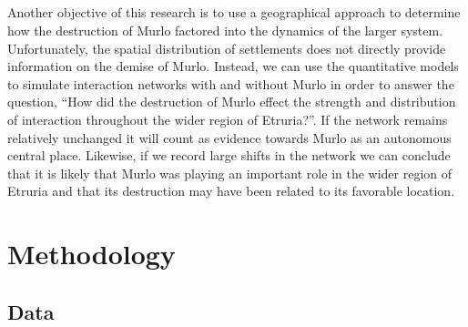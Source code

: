 \documentclass[12pt,a4paper]{thesis}
\begin{document}
\paragraph{}
Another objective of this research is to use a geographical approach to determine how the destruction of Murlo factored into the dynamics of the larger system. Unfortunately, the spatial distribution of settlements does not directly provide information on the demise of Murlo. Instead, we can use the quantitative models to simulate interaction networks with and without Murlo in order to answer the question, ``How did the destruction of Murlo effect the strength and distribution of interaction throughout the wider region of Etruria?''. If the network remains relatively unchanged it will count as evidence towards Murlo as an autonomous central place. Likewise, if we record large shifts in the network we can conclude that it is likely that Murlo was playing an important role in the wider region of Etruria and that its destruction may have been related to its favorable location. 

\chapter{Methodology}
\section{Data}
\end{document}
